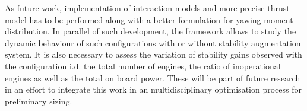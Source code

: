 As future work, implementation of interaction models and more precise thrust model has to be performed along with a better formulation for yawing moment distribution. In parallel of such development, the framework allows to study the dynamic behaviour of such configurations with or without stability augmentation system. It is also necessary to assess the variation of stability gains observed with the configuration i.d. the total number of engines, the ratio of inoperational engines as well as the total on board power. These will be part of future research in an effort to integrate this work in an multidisciplinary optimisation process for preliminary sizing.



%


%
